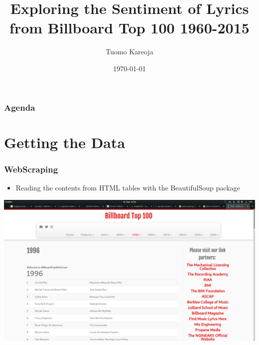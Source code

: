 \documentclass[10pt]{beamer}
\title[Is It Getting Sad?]{Exploring the Sentiment of Lyrics from Billboard Top 100 1960-2015} %
\author{Tuomo Kareoja} %
\date{\today} %
\begin{document}
\begin{frame}
\titlepage %
\end{frame}

\begin{frame}
\frametitle{Agenda} %
\tableofcontents %
\end{frame}


\section{Getting the Data}

\begin{frame}
\frametitle{
    WebScraping
}

\begin{itemize}
    \item Reading the contents from HTML tables with the BeautifulSoup package
\end{itemize}

{
    \centering
    \includegraphics[width=\textwidth, height=\textheight,keepaspectratio]{billboard_top100.png}
    \par
}

\end{frame}
\end{document}
